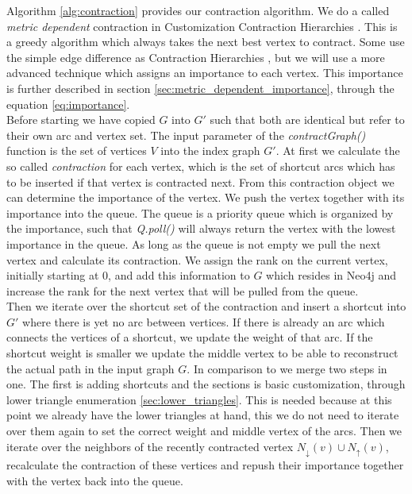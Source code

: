 Algorithm \ref{alg:contraction} provides our contraction algorithm.
We do a called \textit{metric dependent} contraction in Customization Contraction Hierarchies \cite{CCH}.
This is a greedy algorithm which always takes the next best vertex to contract.
Some use the simple edge difference as Contraction Hierarchies \cite{Geisberger_2012}, but we will use a more advanced technique which assigns an importance to each vertex.
This importance is further described in section \ref{sec:metric_dependent_importance}, through the equation \ref{eq:importance}.
\\
Before starting we have copied $G$ into $G'$ such that both are identical but refer to their own arc and vertex set.
The input parameter of the \textit{contractGraph()} function is the set of vertices $V$ into the index graph $G'$.
At first we calculate the so called \textit{contraction} for each vertex, which is the set of shortcut arcs which has to be inserted if that vertex is contracted next.
From this contraction object we can determine the importance of the vertex.
We push the vertex together with its importance into the queue.
The  queue is a priority queue which is organized by the importance, such that \textit{Q.poll()} will always return the vertex with the lowest importance in the queue.
As long as the queue is not empty we pull the next vertex and calculate its contraction.
We assign the rank on the current vertex, initially starting at 0, and add this information to $G$ which resides in Neo4j and increase the rank for the next vertex that will be pulled from the queue.
\\ 
Then we iterate over the shortcut set of the contraction and insert a shortcut into $G'$ where there is yet no arc between vertices.
If there is already an arc which connects the vertices of a shortcut, we update the weight of that arc.
If the shortcut weight is smaller we update the middle vertex to be able to reconstruct the actual path in the input graph $G$.
In comparison to \cite{CCH}  we merge two steps in one.
The first is adding shortcuts and the sections is basic customization, through lower triangle enumeration \ref{sec:lower_triangles}.
This is needed because at this point we already have the lower triangles at hand, this we do not need to iterate over them again to set the correct weight and middle vertex of the arcs.
Then we iterate over the neighbors of the recently contracted vertex $N_\downarrow(v) \cup N_\uparrow(v)$, recalculate the contraction of these vertices and repush their importance together with the vertex back into the queue.
